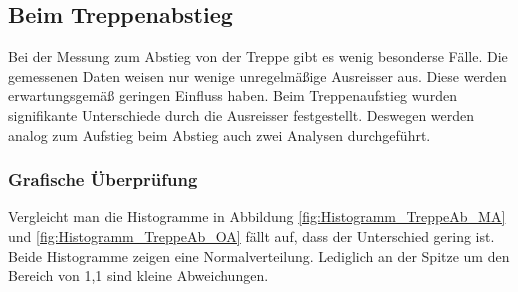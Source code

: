 \subsection{Beim Treppenabstieg}

Bei der Messung zum Abstieg von der Treppe gibt es wenig besonderse Fälle. Die gemessenen Daten weisen nur wenige unregelmäßige Ausreisser aus. Diese werden erwartungsgemäß geringen Einfluss haben. Beim Treppenaufstieg wurden signifikante Unterschiede durch 
die Ausreisser festgestellt. Deswegen werden analog zum Aufstieg beim Abstieg auch zwei Analysen durchgeführt.



\subsubsection{Grafische Überprüfung}

Vergleicht man die Histogramme in Abbildung \ref{fig:Histogramm_TreppeAb_MA} und \ref{fig:Histogramm_TreppeAb_OA} fällt auf, dass der Unterschied gering ist. Beide Histogramme zeigen eine Normalverteilung. Lediglich an der Spitze um den 
Bereich von 1,1 sind kleine Abweichungen.

